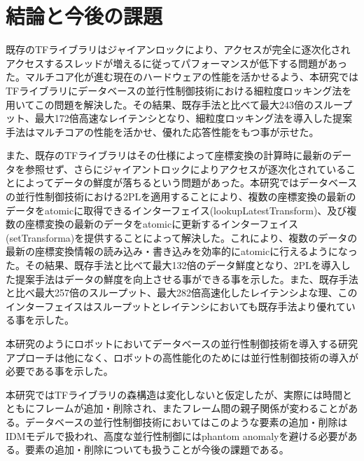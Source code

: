\documentclass[a4paper]{jreport}	%
\begin{document}
\chapter{結論と今後の課題}

既存のTFライブラリはジャイアンロックにより、アクセスが完全に逐次化されアクセスするスレッドが増えるに従ってパフォーマンスが低下する問題があった。マルチコア化が進む現在のハードウェアの性能を活かせるよう、本研究ではTFライブラリにデータベースの並行性制御技術における細粒度ロッキング法を用いてこの問題を解決した。その結果、既存手法と比べて最大243倍のスループット、最大172倍高速なレイテンシとなり、細粒度ロッキング法を導入した提案手法はマルチコアの性能を活かせ、優れた応答性能をもつ事が示せた。


また、既存のTFライブラリはその仕様によって座標変換の計算時に最新のデータを参照せず、さらにジャイアントロックによりアクセスが逐次化されていることによってデータの鮮度が落ちるという問題があった。本研究ではデータベースの並行性制御技術における2PLを適用することにより、複数の座標変換の最新のデータをatomicに取得できるインターフェイス(lookupLatestTransform)、及び複数の座標変換の最新のデータをatomicに更新するインターフェイス(setTransforma)を提供することによって解決した。これにより、複数のデータの最新の座標変換情報の読み込み・書き込みを効率的にatomicに行えるようになった。その結果、既存手法と比べて最大132倍のデータ鮮度となり、2PLを導入した提案手法はデータの鮮度を向上させる事ができる事を示した。また、既存手法と比べ最大257倍のスループット、最大282倍高速化したレイテンシよな理、このインターフェイスはスループットとレイテンシにおいても既存手法より優れている事を示した。

本研究のようにロボットにおいてデータベースの並行性制御技術を導入する研究アプローチは他になく、ロボットの高性能化のためには並行性制御技術の導入が必要である事を示した。

本研究ではTFライブラリの森構造は変化しないと仮定したが、実際には時間とともにフレームが追加・削除され、またフレーム間の親子関係が変わることがある。データベースの並行性制御技術においてはこのような要素の追加・削除はIDMモデルで扱われ、高度な並行性制御にはphantom anomalyを避ける必要がある。要素の追加・削除についても扱うことが今後の課題である。
\end{document}
